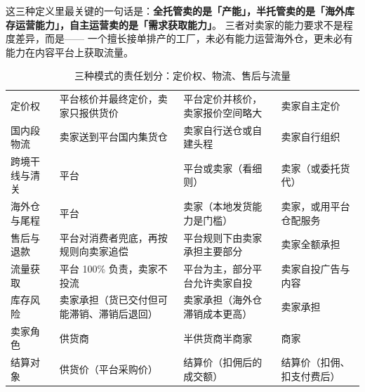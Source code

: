 这三种定义里最关键的一句话是：\textbf{全托管卖的是「产能」，半托管卖的是「海外库存运营能力」，自主运营卖的是「需求获取能力」}。
三者对卖家的能力要求不是程度差异，而是——
一个擅长接单排产的工厂，未必有能力运营海外仓，更未必有能力在内容平台上获取流量。

\begin{table}[htbp]
\centering
\caption{三种模式的责任划分：定价权、物流、售后与流量}
\label{tab:plat-responsibility}
\small
\begin{tabularx}{\textwidth}{L{2.1cm} L{3.5cm} L{3.5cm} Y}
\toprule
{} &  &  &  \\
\midrule
定价权 & 平台核价并最终定价，卖家只报供货价 & 平台定价并核价，卖家报价空间略大 & 卖家自主定价 \\
\addlinespace
国内段物流 & 卖家送到平台国内集货仓 & 卖家自行送仓或自建头程 & 卖家自行组织 \\
\addlinespace
跨境干线与清关 & 平台 & 平台或卖家（看细则） & 卖家（或委托货代） \\
\addlinespace
海外仓与尾程 & 平台 & 卖家（本地发货能力是门槛） & 卖家，或用平台仓配服务 \\
\addlinespace
售后与退款 & 平台对消费者兜底，再按规则向卖家追偿 & 平台规则下由卖家承担主要部分 & 卖家全额承担 \\
\addlinespace
流量获取 & 平台 100\% 负责，卖家不投流 & 平台为主，部分平台允许卖家自投 & 卖家自投广告与内容 \\
\addlinespace
库存风险 & 卖家承担（货已交付但可能滞销、滞销后退回） & 卖家承担（海外仓滞销成本更高） & 卖家承担 \\
\addlinespace
卖家角色 & 供货商 & 半供货商半商家 & 商家 \\
\addlinespace
结算对象 & 供货价（平台采购价） & 结算价（扣佣后的成交额） & 结算价（扣佣、扣支付费后） \\
\bottomrule
\end{tabularx}
\end{table}

